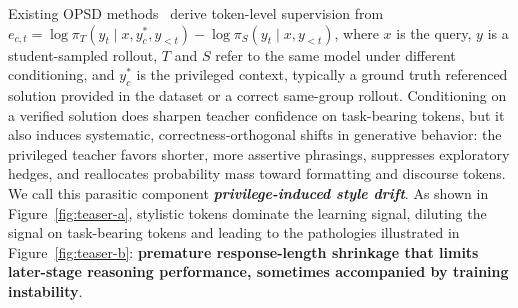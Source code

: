 Existing OPSD methods~\citep{zhao2026self,hubotter2026reinforcement,yang2026self} derive token-level supervision from $e_{c,t} = \log \pi_T(y_t\mid x, y_c^*, y_{<t}) - \log \pi_S(y_t\mid x, y_{<t})$, where $x$ is the query, $y$ is a student-sampled rollout, $T$ and $S$ refer to the same model under different conditioning, and $y^*_c$ is the privileged context, typically a ground truth referenced solution provided in the dataset or a correct same-group rollout. Conditioning on a verified solution does sharpen teacher confidence on task-bearing tokens, but it also induces systematic, correctness-orthogonal shifts in generative behavior: the privileged teacher favors shorter, more assertive phrasings, suppresses exploratory hedges, and reallocates probability mass toward formatting and discourse tokens. We call this parasitic component \textbf{\emph{privilege-induced style drift}}. As shown in Figure~\ref{fig:teaser-a}, stylistic tokens dominate the learning signal, diluting the signal on task-bearing tokens and leading to the pathologies illustrated in Figure~\ref{fig:teaser-b}: \textbf{premature response-length shrinkage that limits later-stage reasoning performance, sometimes accompanied by training instability}.

